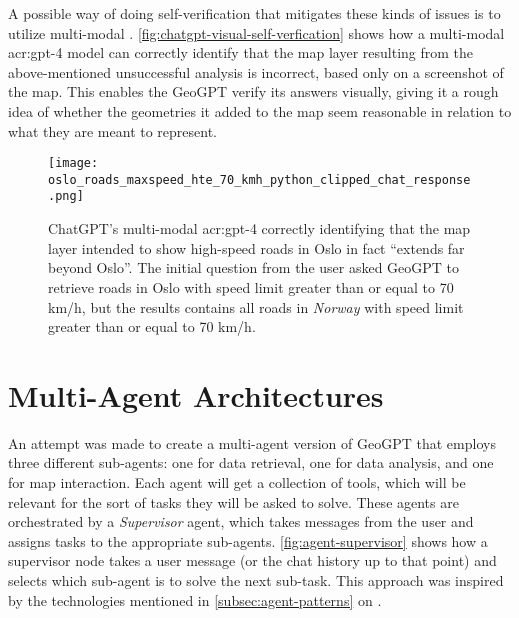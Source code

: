 A possible way of doing self-verification that mitigates these kinds of issues is to utilize multi-modal . \autoref{fig:chatgpt-visual-self-verfication} shows how a multi-modal \acrshort{acr:gpt}-4 model can correctly identify that the map layer resulting from the above-mentioned unsuccessful analysis is incorrect, based only on a screenshot of the map. This enables the GeoGPT verify its answers visually, giving it a rough idea of whether the geometries it added to the map seem reasonable in relation to what they are meant to represent.

\begin{figure}
    \centering
    \texttt{[image: oslo\_roads\_maxspeed\_hte\_70\_kmh\_python\_clipped\_chat\_response.png]}
    \caption[Using the multi-modal GPT-4 model to identify errors in image of generated road map layer]{ChatGPT's multi-modal \acrshort{acr:gpt}-4 correctly identifying that the map layer intended to show high-speed roads in Oslo in fact \enquote{extends far beyond Oslo}. The initial question from the user asked GeoGPT to retrieve roads in Oslo with speed limit greater than or equal to 70 km/h, but the results contains all roads in \textit{Norway} with speed limit greater than or equal to 70 km/h.}
    \label{fig:chatgpt-visual-self-verfication}
\end{figure}

\FloatBarrier

\section{Multi-Agent Architectures}
\label{sec:multi-agent-architectures}

An attempt was made to create a multi-agent version of GeoGPT that employs three different sub-agents: one for data retrieval, one for data analysis, and one for map interaction. Each agent will get a collection of tools, which will be relevant for the sort of tasks they will be asked to solve. These agents are orchestrated by a \textit{Supervisor} agent, which takes messages from the user and assigns tasks to the appropriate sub-agents. \autoref{fig:agent-supervisor} shows how a supervisor node takes a user message (or the chat history up to that point) and selects which sub-agent is to solve the next sub-task. This approach was inspired by the technologies mentioned in \autoref{subsec:agent-patterns} on .



